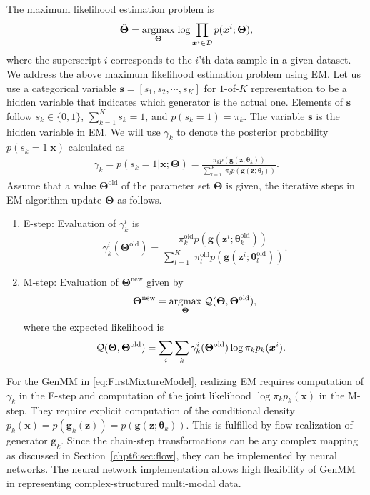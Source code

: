 The maximum likelihood estimation problem is
\begin{equation}\label{eq:max-genmm}
  \hat{\bm{\Theta}} = \underset{\bm{\Theta}}{\operatorname{argmax}}\;{\log{\prod_{\bm{x}^{i} \in \mathcal{D}} p(\bm{x}^{i};\bm{\Theta})}},
\end{equation}
where the superscript $i$ corresponds to the $i$'th data sample in a given dataset.
We address the above maximum likelihood estimation problem using EM. 
Let us use a categorical variable $\bm{s} = [s_1, s_2, \cdots, s_K]$
for $1$-of-$K$ representation to be a hidden variable that indicates which generator is the actual one. Elements of $\bm{s}$ follow $s_k \in \{0,1\}$, $\sum_{k=1}^K s_k =1$, and $p(s_k=1)=\pi_k$. The variable $\bm{s}$ is the hidden variable in EM. We will use $\gamma_k$ to denote the posterior probability $p(s_k =1|\bm{x})$ calculated as
\begin{align}\label{eq-genmm-gamma-org}
  \gamma_k = p(s_k =1|\bm{x};\bm{\Theta}) 
  = \frac{\pi_k p(\bm{g}(\bm{z};\bm{\theta}_k))}{\sum_{l=1}^K\; \pi_l p(\bm{g}(\bm{z};\bm{\theta}_l))}.
\end{align}
Assume that a value $\bm{\Theta}^{\mathrm{old}}$ of the parameter set $\bm{\Theta}$ is given, the iterative steps in EM algorithm update $\bm{\Theta}$ as follows.
\begin{enumerate}
\item E-step: Evaluation of $\gamma_{k}^{i}$ is 
  \begin{equation}\label{eq-genmm-e-step}
    \gamma_{k}^{i}(\bm{\Theta}^{\mathrm{old}}) = \frac{\pi_k^\mathrm{{old}} p(\bm{g}(\bm{z}^{i};\bm{\theta}_k^{\mathrm{old}}))}{\sum_{l=1}^K\; \pi_l^\mathrm{{old}} p(\bm{g}(\bm{z}^{i};\bm{\theta}_l^{\mathrm{old}}))}.   
  \end{equation}
\item M-step: Evaluation of $\bm{\Theta}^{\mathrm{new}}$ given by
  \begin{equation}\label{eq-genmm-opt}
    \bm{\Theta}^{\mathrm{new}} =   \underset{\bm{\Theta}}{\operatorname{argmax}}\;{\mathcal{Q} (\bm{\Theta},\bm{\Theta}^{\mathrm{old}})}, 
  \end{equation}
  where the expected likelihood is
  \begin{equation}
    \hspace{-8pt}\mathcal{Q} (\bm{\Theta},\bm{\Theta}^{\mathrm{old}}) = \sum_{i}\sum_{k} \gamma_{k}^{i}(\bm{\Theta}^{\mathrm{old}}) \log \pi_k p_k(\bm{x}^{i}).
  \end{equation}
\end{enumerate}

For the GenMM in \eqref{eq:FirstMixtureModel}, realizing EM requires computation of $\gamma_k$ in the E-step and computation of the joint likelihood $\log{\pi_k p_k(\bm{x})}$ in the M-step. They require explicit computation of the conditional density $p_k(\bm{x}) =  p(\bm{g}_k(\bm{z})) =p(\bm{g}(\bm{z};\bm{\theta}_k))$. This is fulfilled by flow realization of generator $\bm{g}_k$. Since the chain-step transformations can be any complex mapping as discussed in Section~\ref{chpt6:sec:flow}, they can be implemented by neural networks. The neural network implementation allows high flexibility of GenMM in representing complex-structured multi-modal data.

